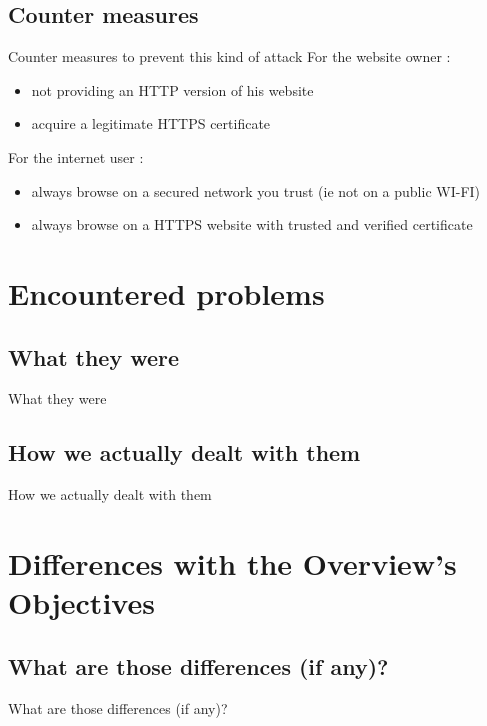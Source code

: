 \documentclass{beamer}
\begin{document}
\subsection{Counter measures}
\begin{frame}{Counter measures to prevent this kind of attack}
For the website owner : \\
	\begin{itemize}
		\pause \item not providing an HTTP version of his website\\
		\pause \item acquire a legitimate HTTPS certificate\\
	\end{itemize}
For the internet user : \\
	\begin{itemize}
		\pause \item always browse on a secured network you trust (ie not on a public WI-FI)\\
		\pause \item always browse on a HTTPS website with trusted and verified certificate\\
	\end{itemize}
\end{frame}

\section{Encountered problems}

\subsection{What they were}
\begin{frame}{What they were}

\end{frame}

\subsection{How we actually dealt with them}
\begin{frame}{How we actually dealt with them}

\end{frame}

\section{Differences with the Overview's Objectives}
\subsection{What are those differences (if any)?}
\begin{frame}{What are those differences (if any)?}

\end{frame}
\end{document}
